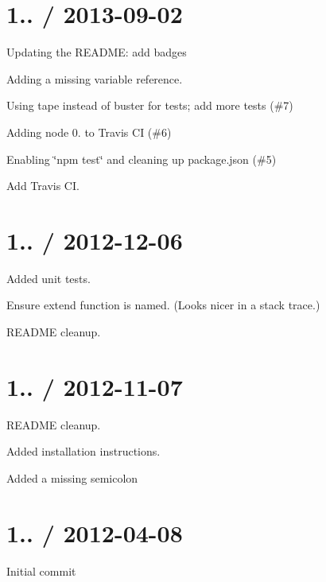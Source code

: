 \section*{1.. / 2013-\/09-\/02 }


\begin{DoxyItemize}
\item Updating the R\+E\+A\+D\+ME\+: add badges
\item Adding a missing variable reference.
\item Using {\ttfamily tape} instead of {\ttfamily buster} for tests; add more tests (\#7)
\item Adding node 0. to Travis CI (\#6)
\item Enabling \char`\"{}npm test\char`\"{} and cleaning up package.\+json (\#5)
\item Add Travis CI.
\end{DoxyItemize}

\section*{1.. / 2012-\/12-\/06 }


\begin{DoxyItemize}
\item Added unit tests.
\item Ensure extend function is named. (Looks nicer in a stack trace.)
\item R\+E\+A\+D\+ME cleanup.
\end{DoxyItemize}

\section*{1.. / 2012-\/11-\/07 }


\begin{DoxyItemize}
\item R\+E\+A\+D\+ME cleanup.
\item Added installation instructions.
\item Added a missing semicolon
\end{DoxyItemize}

\section*{1.. / 2012-\/04-\/08 }


\begin{DoxyItemize}
\item Initial commit 
\end{DoxyItemize}